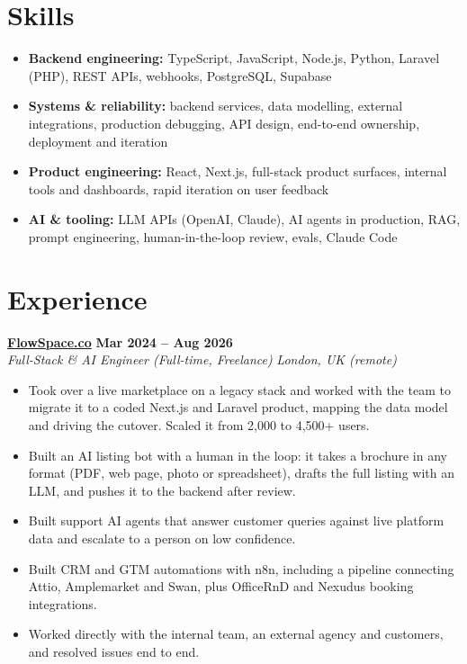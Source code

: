 \documentclass[a4paper,10pt]{article}
\newcommand{\role}[4]{%
 \textbf{#1} \hfill \textbf{#2}\\[1pt]%
 \textit{#3} \hfill \textit{#4}\\[2pt]%
}
\begin{document}
\section{Skills}
\begin{itemize}
 \item \textbf{Backend engineering:} TypeScript, JavaScript, Node.js, Python, Laravel (PHP), REST APIs, webhooks, PostgreSQL, Supabase
 \item \textbf{Systems \& reliability:} backend services, data modelling, external integrations, production debugging, API design, end-to-end ownership, deployment and iteration
 \item \textbf{Product engineering:} React, Next.js, full-stack product surfaces, internal tools and dashboards, rapid iteration on user feedback
 \item \textbf{AI \& tooling:} LLM APIs (OpenAI, Claude), AI agents in production, RAG, prompt engineering, human-in-the-loop review, evals, Claude Code
\end{itemize}

\section{Experience}

\role{\href{https://flowspace.co}{FlowSpace.co}}{Mar 2024 -- Aug 2026}{Full-Stack \& AI Engineer (Full-time, Freelance)}{London, UK (remote)}
\begin{itemize}
 \item Took over a live marketplace on a legacy stack and worked with the team to migrate it to a coded Next.js and Laravel product, mapping the data model and driving the cutover. Scaled it from 2,000 to 4,500+ users.
 \item Built an AI listing bot with a human in the loop: it takes a brochure in any format (PDF, web page, photo or spreadsheet), drafts the full listing with an LLM, and pushes it to the backend after review.
 \item Built support AI agents that answer customer queries against live platform data and escalate to a person on low confidence.
 \item Built CRM and GTM automations with n8n, including a pipeline connecting Attio, Amplemarket and Swan, plus OfficeRnD and Nexudus booking integrations.
 \item Worked directly with the internal team, an external agency and customers, and resolved issues end to end.
\end{itemize}
\end{document}
